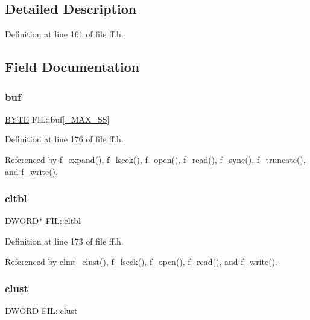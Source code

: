 \subsection{Detailed Description}


Definition at line 161 of file ff.\+h.



\subsection{Field Documentation}
\mbox{\label{structFIL_a7a95fb86588663e48309b5cded7e207b}} 
\subsubsection{\texorpdfstring{buf}{buf}}
{\footnotesize\ttfamily \hyperlink{integer_8h_a4ae1dab0fb4b072a66584546209e7d58}{B\+Y\+TE} F\+I\+L\+::buf\mbox{[}\hyperlink{ffconf_8h_ac271b697378912f17132cb9c7d0de024}{\+\_\+\+M\+A\+X\+\_\+\+SS}\mbox{]}}



Definition at line 176 of file ff.\+h.



Referenced by f\+\_\+expand(), f\+\_\+lseek(), f\+\_\+open(), f\+\_\+read(), f\+\_\+sync(), f\+\_\+truncate(), and f\+\_\+write().

\mbox{\label{structFIL_a28a30613d48cefcf9efbd334cd861fc8}} 
\subsubsection{\texorpdfstring{cltbl}{cltbl}}
{\footnotesize\ttfamily \hyperlink{integer_8h_ad342ac907eb044443153a22f964bf0af}{D\+W\+O\+RD}$\ast$ F\+I\+L\+::cltbl}



Definition at line 173 of file ff.\+h.



Referenced by clmt\+\_\+clust(), f\+\_\+lseek(), f\+\_\+open(), f\+\_\+read(), and f\+\_\+write().

\mbox{\label{structFIL_aa41312aba551b9a6d1c9d3c8c7d2734b}} 
\subsubsection{\texorpdfstring{clust}{clust}}
{\footnotesize\ttfamily \hyperlink{integer_8h_ad342ac907eb044443153a22f964bf0af}{D\+W\+O\+RD} F\+I\+L\+::clust}



